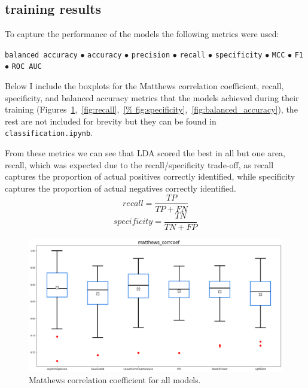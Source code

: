\documentclass[12pt]{article}
\begin{document}
\subsection{training results}

To capture the performance of the models the following metrics were used:
\begin{center}
    \texttt{balanced accuracy}
    $\bullet$
    \texttt{accuracy}
    $\bullet$
    \texttt{precision}
    $\bullet$
    \texttt{recall}
    $\bullet$
    \texttt{specificity}
    $\bullet$
    \texttt{MCC}
    $\bullet$
    \texttt{F1}
    $\bullet$
    \texttt{ROC AUC}
\end{center}

Below I include the boxplots for the Matthews correlation coefficient,
recall, specificity, and balanced accuracy metrics that the models achieved
during their training (Figures~\ref{fig:mcc},~\ref{fig:recall},~\ref{%
fig:specificity},~\ref{fig:balanced_accuracy}), the rest are not included for
brevity but they can be found in \texttt{classification.ipynb}.

From these metrics we can see that LDA scored the best in all but one area,
recall, which was expected due to the recall/specificity trade-off, as
recall captures the proportion of actual positives correctly identified, while
specificity captures the proportion of actual negatives correctly identified.
\[
recall = \frac{TP}{TP + FN}
\]
\[
specificity = \frac{TN}{TN + FP}
\]


\begin{figure}[H]
    \centering
    \includegraphics[width=\textwidth]{ims/mcc.png}
    \caption{Matthews correlation coefficient for all models.}
    \label{fig:mcc}
\end{figure}
\end{document}
